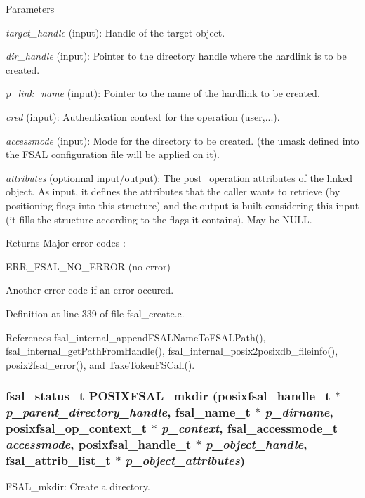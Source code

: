 \begin{DoxyParams}{Parameters}
\item[{\em target\_\-handle}](input): Handle of the target object. \item[{\em dir\_\-handle}](input): Pointer to the directory handle where the hardlink is to be created. \item[{\em p\_\-link\_\-name}](input): Pointer to the name of the hardlink to be created. \item[{\em cred}](input): Authentication context for the operation (user,...). \item[{\em accessmode}](input): Mode for the directory to be created. (the umask defined into the FSAL configuration file will be applied on it). \item[{\em attributes}](optionnal input/output): The post\_\-operation attributes of the linked object. As input, it defines the attributes that the caller wants to retrieve (by positioning flags into this structure) and the output is built considering this input (it fills the structure according to the flags it contains). May be NULL.\end{DoxyParams}
\begin{DoxyReturn}{Returns}
Major error codes :
\begin{DoxyItemize}
\item ERR\_\-FSAL\_\-NO\_\-ERROR (no error)
\item Another error code if an error occured. 
\end{DoxyItemize}
\end{DoxyReturn}


Definition at line 339 of file fsal\_\-create.c.

References fsal\_\-internal\_\-appendFSALNameToFSALPath(), fsal\_\-internal\_\-getPathFromHandle(), fsal\_\-internal\_\-posix2posixdb\_\-fileinfo(), posix2fsal\_\-error(), and TakeTokenFSCall().
\subsubsection[{POSIXFSAL\_\-mkdir}]{\setlength{\rightskip}{0pt plus 5cm}fsal\_\-status\_\-t POSIXFSAL\_\-mkdir (posixfsal\_\-handle\_\-t $\ast$ {\em p\_\-parent\_\-directory\_\-handle}, \/  fsal\_\-name\_\-t $\ast$ {\em p\_\-dirname}, \/  posixfsal\_\-op\_\-context\_\-t $\ast$ {\em p\_\-context}, \/  fsal\_\-accessmode\_\-t {\em accessmode}, \/  posixfsal\_\-handle\_\-t $\ast$ {\em p\_\-object\_\-handle}, \/  fsal\_\-attrib\_\-list\_\-t $\ast$ {\em p\_\-object\_\-attributes})}\label{fsal__create_8c_a0ab78b1f3caa8c07048d6369d26d6616}
FSAL\_\-mkdir: Create a directory.


